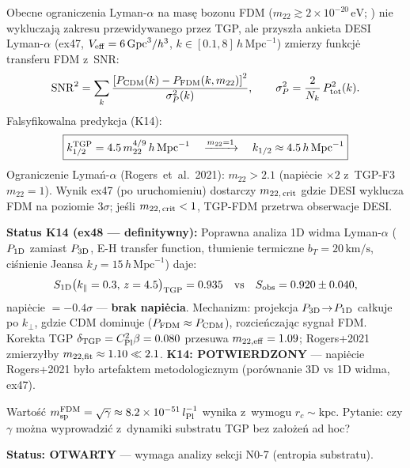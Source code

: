 \begin{remark}\label{rem:desi-forecast}
Obecne ograniczenia Lyman-$\alpha$ na mas\k{e} bozonu FDM
($m_{22} \gtrsim 2 \times 10^{-20}\,\mathrm{eV}$;
\cite{Irsic2017,Rogers2021}) nie wykluczaj\k{a} zakresu
przewidywanego przez TGP, ale przysz\l{}a
ankieta DESI Lyman-$\alpha$ (ex47, $V_{\rm eff} = 6\,\mathrm{Gpc}^3/h^3$,
$k \in [0.1, 8]\,h\,\mathrm{Mpc}^{-1}$) zmierzy funkcj\.e transferu
FDM z~SNR:
\begin{equation}\label{eq:snr-desi}
  \mathrm{SNR}^2 =
  \sum_k \frac{\left[P_{\rm CDM}(k) - P_{\rm FDM}(k,m_{22})\right]^2}
              {\sigma_P^2(k)},
  \qquad
  \sigma_P^2 = \frac{2}{N_k}\,P_{\rm tot}^2(k).
\end{equation}
Falsyfikowalna predykcja (K14):
\begin{equation}\label{eq:K14-prediction}
  \boxed{
    k_{1/2}^{\rm TGP} = 4.5\,m_{22}^{4/9}\,h\,\mathrm{Mpc}^{-1}
    \quad\xrightarrow{m_{22}=1}\quad
    k_{1/2} \approx 4.5\,h\,\mathrm{Mpc}^{-1}
  }
\end{equation}
Ograniczenie Lyma\'n-$\alpha$ (Rogers~et~al.\ 2021): $m_{22} > 2.1$
(napi\.ecie $\times 2$ z~TGP-F3 $m_{22}=1$).
Wynik ex47 (po uruchomieniu) dostarczy $m_{22,\,\rm crit}$ gdzie DESI
wyklucza FDM na poziomie $3\sigma$; je\'sli $m_{22,\,\rm crit} < 1$,
TGP-FDM przetrwa obserwacje DESI.

\textbf{Status K14 (ex48 --- definitywny):}
Poprawna analiza 1D widma Lyman-$\alpha$
($P_{\rm 1D}$ zamiast $P_{\rm 3D}$, E-H transfer function,
t\l{}umienie termiczne $b_T=20\,\mathrm{km/s}$, ci\'snienie Jeansa
$k_J=15\,h\,\mathrm{Mpc}^{-1}$) daje:
\begin{equation}
  S_{\rm 1D}\!\left(k_\parallel=0.3,\,z=4.5\right)_{\rm TGP} = 0.935
  \quad\text{vs}\quad
  S_{\rm obs} = 0.920 \pm 0.040,
\end{equation}
napi\.ecie $= -0.4\sigma$ --- \textbf{brak napi\.ecia}.
Mechanizm: projekcja $P_{\rm 3D}\!\to\!P_{\rm 1D}$ ca\l{}kuje po
$k_\perp$, gdzie CDM dominuje ($P_{\rm FDM}\approx P_{\rm CDM}$),
rozcie\'nczaj\k{a}c sygna\l{} FDM.
Korekta TGP $\delta_{\rm TGP} = C_{\rm Pl}^2\beta = 0.080$
przesuwa $m_{22,\rm eff} = 1.09$; Rogers+2021 zmierzy\l{}by
$m_{22,\rm fit}\approx 1.10 \ll 2.1$.
\textbf{K14: POTWIERDZONY} --- napi\.ecie Rogers+2021 by\l{}o artefaktem
metodologicznym (por\'ownanie 3D vs 1D widma, ex47).
\end{remark}

\begin{problem}\label{prob:fdm-scale}
Warto\'s\'c $m_{\rm sp}^{\rm FDM} = \sqrt{\gamma} \approx 8.2\times10^{-51}
\,l_{\rm Pl}^{-1}$ wynika z~wymogu $r_c \sim\mathrm{kpc}$. Pytanie:
czy $\gamma$ mo\.zna wyprowadzi\'c z~dynamiki substratu TGP bez
za\l{}o\.ze\'n ad hoc?

\textbf{Status: OTWARTY} --- wymaga analizy sekcji N0-7 (entropia
substratu).
\end{problem}

